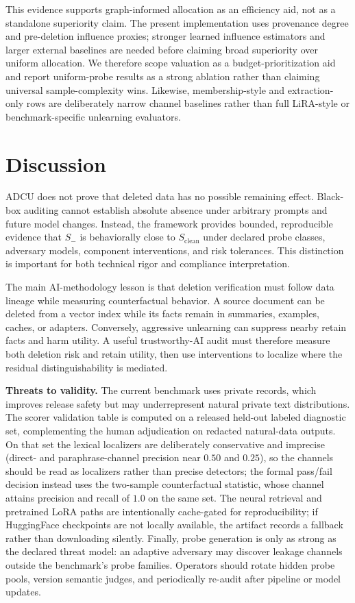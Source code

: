\documentclass[10pt,journal,compsoc]{IEEEtran}
\newcommand{\method}{ADCU}
\begin{document}
This evidence supports graph-informed allocation as an efficiency aid, not as a standalone superiority claim. The present implementation uses provenance degree and pre-deletion influence proxies; stronger learned influence estimators and larger external baselines are needed before claiming broad superiority over uniform allocation. We therefore scope valuation as a budget-prioritization aid and report uniform-probe results as a strong ablation rather than claiming universal sample-complexity wins. Likewise, membership-style and extraction-only rows are deliberately narrow channel baselines rather than full LiRA-style or benchmark-specific unlearning evaluators.


\section{Discussion}

\method{} does not prove that deleted data has no possible remaining effect. Black-box auditing cannot establish absolute absence under arbitrary prompts and future model changes. Instead, the framework provides bounded, reproducible evidence that $S_-$ is behaviorally close to $S_{\mathrm{clean}}$ under declared probe classes, adversary models, component interventions, and risk tolerances. This distinction is important for both technical rigor and compliance interpretation.

The main AI-methodology lesson is that deletion verification must follow data lineage while measuring counterfactual behavior. A source document can be deleted from a vector index while its facts remain in summaries, examples, caches, or adapters. Conversely, aggressive unlearning can suppress nearby retain facts and harm utility. A useful trustworthy-AI audit must therefore measure both deletion risk and retain utility, then use interventions to localize where the residual distinguishability is mediated.

\textbf{Threats to validity.}
The current benchmark uses private records, which improves release safety but may underrepresent natural private text distributions. The scorer validation table is computed on a released held-out labeled diagnostic set, complementing the human adjudication on redacted natural-data outputs. On that set the lexical localizers are deliberately conservative and imprecise (direct- and paraphrase-channel precision near $0.50$ and $0.25$), so the channels should be read as localizers rather than precise detectors; the formal pass/fail decision instead uses the two-sample counterfactual statistic, whose channel attains precision and recall of $1.0$ on the same set. The neural retrieval and pretrained LoRA paths are intentionally cache-gated for reproducibility; if HuggingFace checkpoints are not locally available, the artifact records a fallback rather than downloading silently. Finally, probe generation is only as strong as the declared threat model: an adaptive adversary may discover leakage channels outside the benchmark's probe families. Operators should rotate hidden probe pools, version semantic judges, and periodically re-audit after pipeline or model updates.
\end{document}
